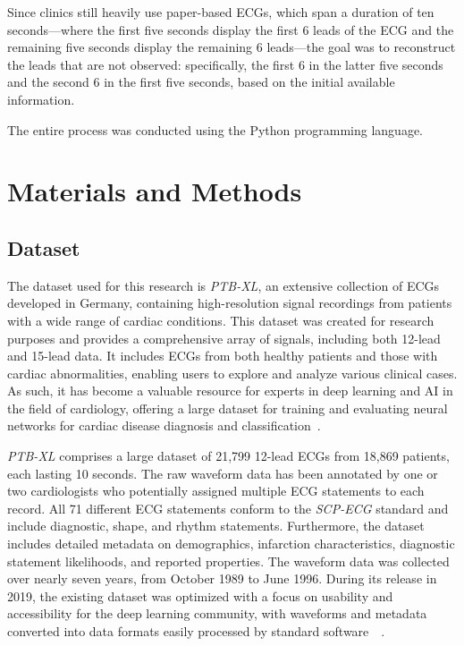 \documentclass[12pt,italian]{report}
\begin{document}
Since clinics still heavily use paper-based ECGs, which span a duration of ten seconds—where the first five seconds display the first 6 leads of the ECG and the remaining five seconds display the remaining 6 leads—the goal was to reconstruct the leads that are not observed: specifically, the first 6 in the latter five seconds and the second 6 in the first five seconds, based on the initial available information.

The entire process was conducted using the Python programming language.

\chapter{Materials and Methods}
\label{chap:materials}

\section{Dataset}
\label{sec:dataset}

The dataset used for this research is \textit{PTB-XL}, an extensive collection of ECGs developed in Germany, containing high-resolution signal recordings from patients with a wide range of cardiac conditions. This dataset was created for research purposes and provides a comprehensive array of signals, including both 12-lead and 15-lead data. It includes ECGs from both healthy patients and those with cardiac abnormalities, enabling users to explore and analyze various clinical cases. As such, it has become a valuable resource for experts in deep learning and AI in the field of cardiology, offering a large dataset for training and evaluating neural networks for cardiac disease diagnosis and classification~\cite{datasetdistro}.

\textit{PTB-XL} comprises a large dataset of 21,799 12-lead ECGs from 18,869 patients, each lasting 10 seconds. The raw waveform data has been annotated by one or two cardiologists who potentially assigned multiple ECG statements to each record. All 71 different ECG statements conform to the \textit{SCP-ECG} standard and include diagnostic, shape, and rhythm statements. Furthermore, the dataset includes detailed metadata on demographics, infarction characteristics, diagnostic statement likelihoods, and reported properties. The waveform data was collected over nearly seven years, from October 1989 to June 1996. During its release in 2019, the existing dataset was optimized with a focus on usability and accessibility for the deep learning community, with waveforms and metadata converted into data formats easily processed by standard software~\cite{dataset}~\cite{datasetref}.
\end{document}
